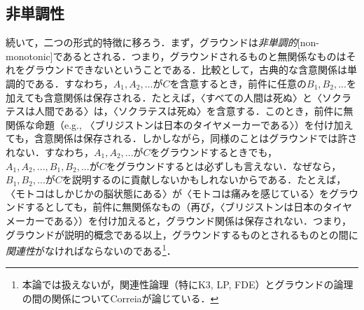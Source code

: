 \documentclass[twoside,14Q,uplatex,dvipdfmx]{jsarticle}
\theoremstyle{definition}
\begin{document}
\subsection{非単調性}\label{nonmonotonic}
続いて，二つの形式的特徴に移ろう．まず，グラウンドは\emph{非単調的}[non-monotonic]であるとされる．つまり，グラウンドされるものと無関係なものはそれをグラウンドできないということである．比較として，古典的な含意関係は単調的である．すなわち，$A_1 ,A_2 ,...$が$C$を含意するとき，前件に任意の$B_1 ,B_2 ,...$を加えても含意関係は保存される．たとえば，〈すべての人間は死ぬ〉と〈ソクラテスは人間である〉は，〈ソクラテスは死ぬ〉を含意する．このとき，前件に無関係な命題（e.g., 〈ブリジストンは日本のタイヤメーカーである〉）を付け加えても，含意関係は保存される．しかしながら，同様のことはグラウンドでは許されない．すなわち，$A_1 ,A_2 ,...$が$C$をグラウンドするときでも，$A_1 ,A_2 ,...,B_1 ,B_2 ,...$が$C$をグラウンドするとは必ずしも言えない．なぜなら，$B_1 ,B_2 ,...$が$C$を説明するのに貢献しないかもしれないからである．たとえば，〈モトコはしかじかの脳状態にある〉が〈モトコは痛みを感じている〉をグラウンドするとしても，前件に無関係なもの（再び，〈ブリジストンは日本のタイヤメーカーである〉）を付け加えると，グラウンド関係は保存されない．つまり，グラウンドが説明的概念である以上，グラウンドするものとされるものとの間に\emph{関連性}がなければならないのである\footnote{本論では扱えないが，関連性論理（特にK3, LP, FDE）とグラウンドの論理の間の関係についてCorreia\cite[pp.42--3]{Correia2014}が論じている．}．
\end{document}
